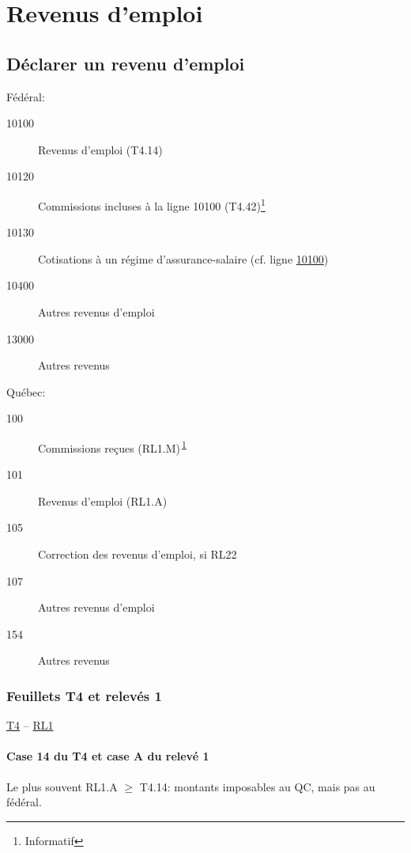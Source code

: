 \chapter{Revenus d’emploi}
\section{Déclarer un revenu d’emploi}
Fédéral:
\ca
\begin{description}
	\item[10100] Revenus d'emploi (T4.14)
	\item[10120] Commissions incluses à la ligne 10100 (T4.42)\footnote{\label{inf}Informatif}
	\item[10130] Cotisations à un régime d'assurance-salaire (cf. ligne \href{https://www.canada.ca/fr/agence-revenu/services/impot/particuliers/sujets/tout-votre-declaration-revenus/declaration-revenus/remplir-declaration-revenus/revenu-personnel/ligne-10100-revenus-emploi.html}{10100})
	\item[10400] Autres revenus d'emploi
	\item[13000] Autres revenus
\end{description}

Québec:
\qc
\begin{description}
	\item[100] Commissions reçues (RL1.M)\textsuperscript{\,\ref{inf}}
	\item[101] Revenus d'emploi (RL1.A)
	\item[105] Correction des revenus d'emploi, si RL22
	\item[107] Autres revenus d'emploi
	\item[154] Autres revenus
\end{description}
\subsection{Feuillets T4 et relevés 1}
\href{https://www.canada.ca/fr/agence-revenu/services/formulaires-publications/formulaires/t4.html}{T4} -- \href{https://www.revenuquebec.ca/fr/services-en-ligne/formulaires-et-publications/details-courant/rl-1/}{RL1}
\subsubsection{Case 14 du T4 et case A du relevé 1}
Le plus souvent RL1.A $\ge$ T4.14: montants imposables au QC, mais pas au fédéral.
